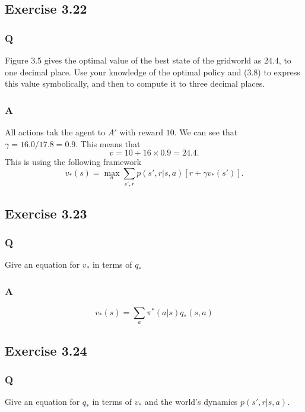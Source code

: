 \subsection{Exercise 3.22}
\subsubsection{Q}
Figure 3.5 gives the optimal value of the best state of the gridworld as $24.4$, to one decimal place. Use your knowledge of the optimal policy and (3.8) to express this value symbolically, and then to compute it to three decimal places.

\subsubsection{A}
All actions tak the agent to $A'$ with reward $10$. We can see that $\gamma = 16.0 / 17.8 = 0.9$. This means that
\begin{equation}
    v = 10 + 16 \times 0.9 = 24.4.
\end{equation}
This is using the following framework
\begin{equation}
    v_*(s) = \max_{a}\sum_{s', r} p (s', r| s, a)[r + \gamma v_*(s')].
\end{equation}


\subsection{Exercise 3.23}
\subsubsection{Q}
Give an equation for $v_*$ in terms of $q_*$

\subsubsection{A}
\begin{equation}
    v_*(s) = \sum_a \pi^*(a | s) q_*(s, a)
\end{equation}


\subsection{Exercise 3.24}
\subsubsection{Q}
Give an equation for $q_*$ in terms of $v_*$ and the world's dynamics $p(s', r| s, a)$.

